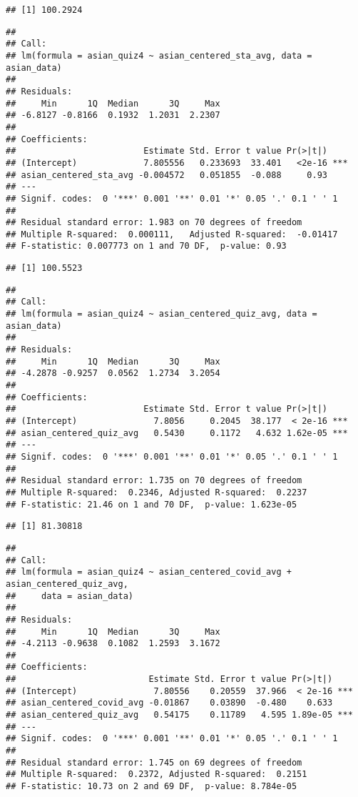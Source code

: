 \documentclass[
]{article}
\begin{document}
\begin{verbatim}
## [1] 100.2924
\end{verbatim}

\begin{verbatim}
## 
## Call:
## lm(formula = asian_quiz4 ~ asian_centered_sta_avg, data = asian_data)
## 
## Residuals:
##     Min      1Q  Median      3Q     Max 
## -6.8127 -0.8166  0.1932  1.2031  2.2307 
## 
## Coefficients:
##                         Estimate Std. Error t value Pr(>|t|)    
## (Intercept)             7.805556   0.233693  33.401   <2e-16 ***
## asian_centered_sta_avg -0.004572   0.051855  -0.088     0.93    
## ---
## Signif. codes:  0 '***' 0.001 '**' 0.01 '*' 0.05 '.' 0.1 ' ' 1
## 
## Residual standard error: 1.983 on 70 degrees of freedom
## Multiple R-squared:  0.000111,   Adjusted R-squared:  -0.01417 
## F-statistic: 0.007773 on 1 and 70 DF,  p-value: 0.93
\end{verbatim}

\begin{verbatim}
## [1] 100.5523
\end{verbatim}

\begin{verbatim}
## 
## Call:
## lm(formula = asian_quiz4 ~ asian_centered_quiz_avg, data = asian_data)
## 
## Residuals:
##     Min      1Q  Median      3Q     Max 
## -4.2878 -0.9257  0.0562  1.2734  3.2054 
## 
## Coefficients:
##                         Estimate Std. Error t value Pr(>|t|)    
## (Intercept)               7.8056     0.2045  38.177  < 2e-16 ***
## asian_centered_quiz_avg   0.5430     0.1172   4.632 1.62e-05 ***
## ---
## Signif. codes:  0 '***' 0.001 '**' 0.01 '*' 0.05 '.' 0.1 ' ' 1
## 
## Residual standard error: 1.735 on 70 degrees of freedom
## Multiple R-squared:  0.2346, Adjusted R-squared:  0.2237 
## F-statistic: 21.46 on 1 and 70 DF,  p-value: 1.623e-05
\end{verbatim}

\begin{verbatim}
## [1] 81.30818
\end{verbatim}

\begin{verbatim}
## 
## Call:
## lm(formula = asian_quiz4 ~ asian_centered_covid_avg + asian_centered_quiz_avg, 
##     data = asian_data)
## 
## Residuals:
##     Min      1Q  Median      3Q     Max 
## -4.2113 -0.9638  0.1082  1.2593  3.1672 
## 
## Coefficients:
##                          Estimate Std. Error t value Pr(>|t|)    
## (Intercept)               7.80556    0.20559  37.966  < 2e-16 ***
## asian_centered_covid_avg -0.01867    0.03890  -0.480    0.633    
## asian_centered_quiz_avg   0.54175    0.11789   4.595 1.89e-05 ***
## ---
## Signif. codes:  0 '***' 0.001 '**' 0.01 '*' 0.05 '.' 0.1 ' ' 1
## 
## Residual standard error: 1.745 on 69 degrees of freedom
## Multiple R-squared:  0.2372, Adjusted R-squared:  0.2151 
## F-statistic: 10.73 on 2 and 69 DF,  p-value: 8.784e-05
\end{verbatim}
\end{document}

